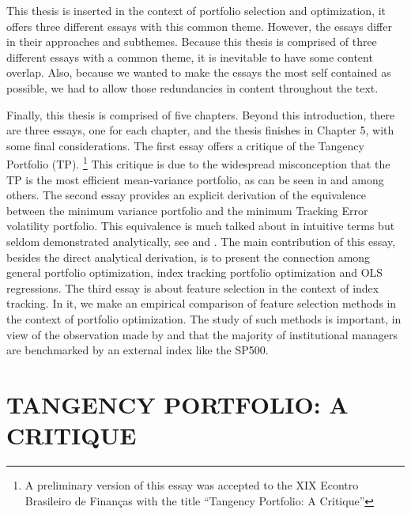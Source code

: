 \documentclass[12pt,oneside,a4paper]{memoir}
\begin{document}
This thesis is inserted in the context of portfolio selection and optimization, it offers three different essays with this common theme.
However, the essays differ in their approaches and subthemes.
Because this thesis is comprised of three different essays with a common theme, it is inevitable to have some content overlap.
Also, because we wanted to make the essays the most self contained as possible, we had to allow those redundancies in content throughout the text.

Finally, this thesis is comprised of five chapters.
Beyond this introduction, there are three essays, one for each chapter, and the thesis finishes in Chapter 5, with some final considerations.
The first essay offers a critique of the Tangency Portfolio (TP).
\footnote{A preliminary version of this essay was accepted to the XIX Econtro Brasileiro de Finanças with the title ``Tangency Portfolio: A Critique''}
This critique is due to the widespread misconception that the TP is the most efficient mean-variance portfolio, as can be seen in  and  among others.
The second essay provides an explicit derivation of the equivalence between the minimum variance portfolio and the minimum Tracking Error volatility portfolio.
This equivalence is much talked about in intuitive terms but seldom demonstrated analytically, see  and .
The main contribution of this essay, besides the direct analytical derivation, is to present the connection among general portfolio optimization, index tracking portfolio optimization and OLS regressions.
The third essay is about feature selection in the context of index tracking.
In it, we make an empirical comparison of feature selection methods in the context of portfolio optimization.
The study of such methods is important, in view of the observation made by  and  that the majority of institutional managers are benchmarked by an external index like the SP500.

\chapter{TANGENCY PORTFOLIO: A CRITIQUE}
\linenumbers
\end{document}
